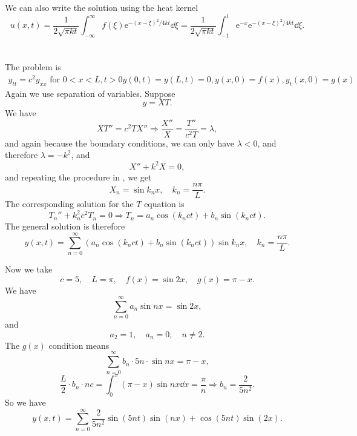 \documentclass[hyperref, a4paper]{article}
\newcommand*{\ee}{\mathrm{e}}
\def\\{}%
\begin{document}
We can also write the solution using the heat kernel 
\begin{equation}
    u(x, t) = \frac{1}{2 \sqrt{\pi k t}} \int_{-\infty}^{\infty} f(\xi) \ee^{-(x-\xi)^2 / 4 k t} \dd \xi
    = \frac{1}{2 \sqrt{\pi k t}} \int_{-1}^{1} \ee^{-x} \ee^{-(x-\xi)^2 / 4 k t} \dd{\xi} .
\end{equation}

\section{}

The problem is 
\begin{equation}
    \begin{gathered}
        y_{t t}=c^2 y_{x x} \text { for } 0<x<L, t>0 \\
        y(0, t)=y(L, t)=0, \\
        y(x, 0)=f(x), \\
        y_t(x, 0)=g(x)
        \end{gathered}
\end{equation}
Again we use separation of variables.
Suppose 
\[
    y = X T.
\]
We have 
\[
    X T'' = c^2 T X'' \Rightarrow 
    \frac{X''}{X} = \frac{T''}{c^2 T} = \lambda, 
\]
and again because the boundary conditions, we can only have $\lambda < 0$, 
and therefore $\lambda = - k^2$, and 
\begin{equation}
    X'' + k^2 X = 0, 
\end{equation}
and repeating the procedure in ,
we get 
\begin{equation}
    X_n = \sin k_n x , \quad k_n = \frac{n \pi}{L}.
\end{equation}
The corresponding solution for the $T$ equation is 
\begin{equation}
    T_n'' + k_n^2 c^2 T_n = 0 \Rightarrow 
    T_n = a_n \cos (k_n c t) + b_n \sin (k_n c t).
\end{equation}
The general solution is therefore 
\begin{equation}
    y(x, t) = \sum_{n=0}^{\infty} (a_n \cos (k_n c t) + b_n \sin (k_n c t)) \sin k_n x,
    \quad k_n = \frac{n \pi}{L}.
\end{equation}

Now we take 
\begin{equation}
    c = 5, \quad L = \pi, \quad f(x)=\sin 2 x, \quad g(x)=\pi-x.
\end{equation}
We have 
\[
    \sum_{n=0}^{\infty} a_n \sin n x = \sin 2 x,  
\]
and 
\begin{equation}
    a_2 = 1, \quad a_n = 0, \quad n \neq 2.
\end{equation}
The $g(x)$ condition means 
\[
    \sum_{n=0}^{\infty} b_n \cdot 5n \cdot \sin n x = \pi - x,
\]
\[
    \frac{L}{2} \cdot b_n \cdot n c = \int_{0}^{\pi} (\pi - x) \sin n x \dd{x}
    = \frac{\pi}{n} 
    \Rightarrow b_n = \frac{2 }{ 5 n^2}  .
\]
So we have 
\begin{equation}
    y(x, t) = \sum_{n=0}^{\infty} \frac{2}{5n^2} \sin (5 n t) \sin (n x) + \cos (5 n t) \sin (2 x). 
\end{equation}
\end{document}
